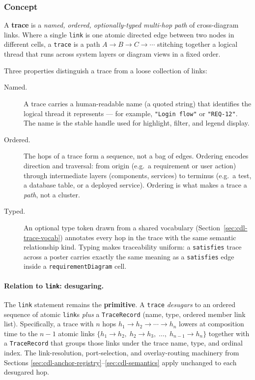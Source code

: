 \subsubsection{Concept}
\label{sec:cdl-trace-concept}

A \textbf{trace} is a \emph{named, ordered, optionally-typed multi-hop path}
of cross-diagram links.  Where a single \texttt{link} is one atomic directed
edge between two nodes in different cells, a \texttt{trace} is a path
$A \to B \to C \to \cdots$ stitching together a logical thread that runs
across system layers or diagram views in a fixed order.

Three properties distinguish a trace from a loose collection of links:

\begin{description}
  \item[Named.]  A trace carries a human-readable name (a quoted string) that
    identifies the logical thread it represents --- for example,
    \texttt{"Login flow"} or \texttt{"REQ-12"}.  The name is the stable
    handle used for highlight, filter, and legend display.

  \item[Ordered.]  The hops of a trace form a sequence, not a bag of edges.
    Ordering encodes direction and traversal: from origin (e.g.\ a requirement
    or user action) through intermediate layers (components, services) to
    terminus (e.g.\ a test, a database table, or a deployed service).
    Ordering is what makes a trace a \emph{path}, not a cluster.

  \item[Typed.]  An optional type token drawn from a shared vocabulary
    (Section~\ref{sec:cdl-trace-vocab}) annotates every hop in the trace with
    the same semantic relationship kind.  Typing makes traceability uniform:
    a \texttt{satisfies} trace across a poster carries exactly the same
    meaning as a \texttt{satisfies} edge inside a \texttt{requirementDiagram}
    cell.
\end{description}

\paragraph{Relation to \texttt{link}: desugaring.}

The \texttt{link} statement remains the \textbf{primitive}.  A \texttt{trace}
\emph{desugars} to an ordered sequence of atomic \texttt{link}s \emph{plus}
a \texttt{TraceRecord} (name, type, ordered member link list).  Specifically,
a trace with $n$ hops $h_1 \to h_2 \to \cdots \to h_n$ lowers at composition
time to the $n - 1$ atomic links $\{h_1 \to h_2,\; h_2 \to h_3,\; \ldots,\;
h_{n-1} \to h_n\}$ together with a \texttt{TraceRecord} that groups those
links under the trace name, type, and ordinal index.  The link-resolution,
port-selection, and overlay-routing machinery from Sections
\ref{sec:cdl-anchor-registry}--\ref{sec:cdl-semantics} apply unchanged to
each desugared hop.

